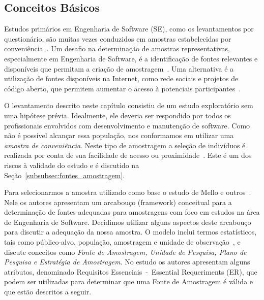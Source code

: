 \subsection{Conceitos Básicos}

Estudos primários em Engenharia de Software (SE), como os levantamentos por
questionário, são muitas vezes conduzidos em amostras estabelecidas por
conveniência~\cite{sjoberg2005survey, dybaa2006systematic}. Um desafio na
determinação de amostras representativas, especialmente em Engenharia de
Software, é a identificação de fontes relevantes e disponíveis que permitam a
criação de amostragem~\cite{de2014towards}. Uma alternativa é a utilização de
fontes disponíveis na Internet, como rede sociais e projetos de código aberto,
que permitem aumentar o acesso à potenciais participantes~\cite{de2013would}.

O levantamento descrito neste capítulo consistiu de um estudo exploratório sem
uma hipótese prévia. Idealmente, ele deveria ser respondido por todos os
profissionais envolvidos com desenvolvimento e manutenção de software. Como não
é possível alcançar essa população, nos conformamos em utilizar uma
\textit{amostra de conveniência}. Neste tipo de amostragem a seleção de
indivíduos é realizada por conta de sua facilidade de acesso ou
proximidade~\cite{marshall1996sampling}. Este é um dos riscos à validade do
estudo e é discutido na Seção~\ref{subsubsec:fontes_amostragem}.

Para selecionarmos a amostra utilizado como base o estudo de Mello e
outros~\cite{de2014towards}. Nele os autores apresentam um arcabouço
(framework) conceitual para a determinação de fontes adequadas para amostragens
com foco em estudos na área de Engenharia de Software. Decidimos utilizar
alguns aspectos deste arcabouço para discutir a adequação da nossa amostra. O
modelo inclui termos estatísticos, tais como público-alvo, população,
amostragem e unidade de observação~\cite{thompson2012sampling}, e discute
conceitos como \textit{Fonte de Amostragem, Unidade de Pesquisa, Plano de
    Pesquisa e Estratégia de Amostragem}. No estudo os autores apresentam
alguns atributos, denominado Requisitos Essenciais~-~Essential Requeriments
(ER), que podem ser utilizadas para determinar que uma Fonte de Amostragem é
válida e que estão descritos a seguir.


